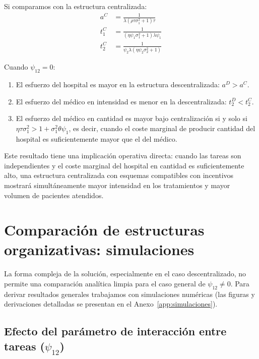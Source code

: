 Si comparamos con la estructura centralizada:
\begin{align}
  a^C &= \frac{1}{\lambda(\rho\tau\sigma_1^2+1)\tau} \label{eq:aC_indep}\\
  t_1^C &= \frac{1}{(\eta\psi_1\sigma_1^2+1)\lambda\psi_1} \label{eq:t1C_indep}\\
  t_2^C &= \frac{1}{\psi_2\lambda(\eta\psi_2\sigma_2^2+1)} \label{eq:t2C_indep}
\end{align}

\begin{result}
\label{res:comparacion_independientes}
Cuando $\psi_{12}=0$:
\begin{enumerate}[label=(\alph*)]
  \item El esfuerzo del hospital es mayor en la estructura descentralizada: $a^D>a^C$.
  \item El esfuerzo del médico en intensidad es menor en la descentralizada: $t_2^D<t_2^C$.
  \item El esfuerzo del médico en cantidad es mayor bajo centralización si y solo si $\eta\tau\sigma_1^2 > 1+\sigma_1^2\theta\psi_1$, es decir, cuando el coste marginal de producir cantidad del hospital es suficientemente mayor que el del médico.
\end{enumerate}
\end{result}

Este resultado tiene una implicación operativa directa: cuando las tareas son independientes y el coste marginal del hospital en cantidad es suficientemente alto, una estructura centralizada con esquemas compatibles con incentivos mostrará simultáneamente mayor intensidad en los tratamientos y mayor volumen de pacientes atendidos.


\section{Comparación de estructuras organizativas: simulaciones}
\label{sec:simulaciones_resumen}

La forma compleja de la solución, especialmente en el caso descentralizado, no permite una comparación analítica limpia para el caso general de $\psi_{12}\neq 0$. Para derivar resultados generales trabajamos con simulaciones numéricas (las figuras y derivaciones detalladas se presentan en el Anexo~\ref{app:simulaciones}).

\subsection{Efecto del parámetro de interacción entre tareas (\texorpdfstring{$\psi_{12}$}{psi\_12})}


